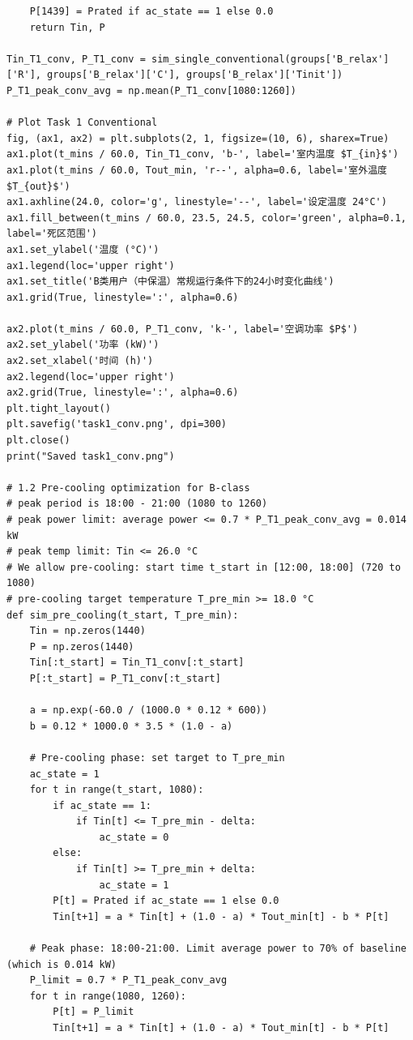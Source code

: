 \documentclass[12pt,a4paper]{article}
\begin{document}
\begin{lstlisting}
    P[1439] = Prated if ac_state == 1 else 0.0
    return Tin, P

Tin_T1_conv, P_T1_conv = sim_single_conventional(groups['B_relax']['R'], groups['B_relax']['C'], groups['B_relax']['Tinit'])
P_T1_peak_conv_avg = np.mean(P_T1_conv[1080:1260])

# Plot Task 1 Conventional
fig, (ax1, ax2) = plt.subplots(2, 1, figsize=(10, 6), sharex=True)
ax1.plot(t_mins / 60.0, Tin_T1_conv, 'b-', label='室内温度 $T_{in}$')
ax1.plot(t_mins / 60.0, Tout_min, 'r--', alpha=0.6, label='室外温度 $T_{out}$')
ax1.axhline(24.0, color='g', linestyle='--', label='设定温度 24°C')
ax1.fill_between(t_mins / 60.0, 23.5, 24.5, color='green', alpha=0.1, label='死区范围')
ax1.set_ylabel('温度 (°C)')
ax1.legend(loc='upper right')
ax1.set_title('B类用户（中保温）常规运行条件下的24小时变化曲线')
ax1.grid(True, linestyle=':', alpha=0.6)

ax2.plot(t_mins / 60.0, P_T1_conv, 'k-', label='空调功率 $P$')
ax2.set_ylabel('功率 (kW)')
ax2.set_xlabel('时间 (h)')
ax2.legend(loc='upper right')
ax2.grid(True, linestyle=':', alpha=0.6)
plt.tight_layout()
plt.savefig('task1_conv.png', dpi=300)
plt.close()
print("Saved task1_conv.png")

# 1.2 Pre-cooling optimization for B-class
# peak period is 18:00 - 21:00 (1080 to 1260)
# peak power limit: average power <= 0.7 * P_T1_peak_conv_avg = 0.014 kW
# peak temp limit: Tin <= 26.0 °C
# We allow pre-cooling: start time t_start in [12:00, 18:00] (720 to 1080)
# pre-cooling target temperature T_pre_min >= 18.0 °C
def sim_pre_cooling(t_start, T_pre_min):
    Tin = np.zeros(1440)
    P = np.zeros(1440)
    Tin[:t_start] = Tin_T1_conv[:t_start]
    P[:t_start] = P_T1_conv[:t_start]
    
    a = np.exp(-60.0 / (1000.0 * 0.12 * 600))
    b = 0.12 * 1000.0 * 3.5 * (1.0 - a)
    
    # Pre-cooling phase: set target to T_pre_min
    ac_state = 1
    for t in range(t_start, 1080):
        if ac_state == 1:
            if Tin[t] <= T_pre_min - delta:
                ac_state = 0
        else:
            if Tin[t] >= T_pre_min + delta:
                ac_state = 1
        P[t] = Prated if ac_state == 1 else 0.0
        Tin[t+1] = a * Tin[t] + (1.0 - a) * Tout_min[t] - b * P[t]
        
    # Peak phase: 18:00-21:00. Limit average power to 70% of baseline (which is 0.014 kW)
    P_limit = 0.7 * P_T1_peak_conv_avg
    for t in range(1080, 1260):
        P[t] = P_limit
        Tin[t+1] = a * Tin[t] + (1.0 - a) * Tout_min[t] - b * P[t]
        

\end{lstlisting}
\end{document}

